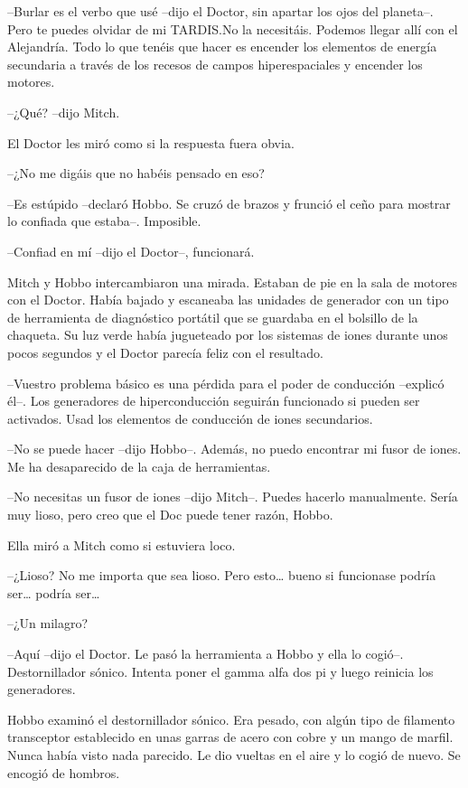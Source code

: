 {--Burlar es el verbo que usé --dijo el Doctor, sin apartar los ojos del
 planeta--. Pero te puedes olvidar de mi TARDIS.\@ No la necesitáis.
 Podemos llegar allí con el Alejandría. Todo lo que tenéis que hacer es
 encender los elementos de energía secundaria a través de los recesos de
campos hiperespaciales y encender los motores.}

{--¿Qué? --dijo Mitch.}

{El Doctor les miró como si la respuesta fuera obvia.}

{--¿No me digáis que no habéis pensado en eso?}

{--Es estúpido --declaró Hobbo. Se cruzó de brazos y frunció el ceño para
mostrar lo confiada que estaba--. Imposible.}

{--Confiad en mí --dijo el Doctor--, funcionará.}

{Mitch y Hobbo intercambiaron una mirada. Estaban de pie en la sala de
 motores con el Doctor. Había bajado y escaneaba las unidades de
 generador con un tipo de herramienta de diagnóstico portátil que se
 guardaba en el bolsillo de la chaqueta. Su luz verde había jugueteado
 por los sistemas de iones durante unos pocos segundos y el Doctor
parecía feliz con el resultado.}

{--Vuestro problema básico es una pérdida para el poder de conducción
 --explicó él--. Los generadores de hiperconducción seguirán funcionado
 si pueden ser activados. Usad los elementos de conducción de iones
secundarios.}

{--No se puede hacer --dijo Hobbo--. Además, no puedo encontrar mi fusor
de iones. Me ha desaparecido de la caja de herramientas.}

{--No necesitas un fusor de iones --dijo Mitch--. Puedes hacerlo
 manualmente. Sería muy lioso, pero creo que el Doc puede tener razón,
Hobbo.}

{Ella miró a Mitch como si estuviera loco.}

{--¿Lioso? No me importa que sea lioso. Pero esto\ldots{} bueno si
 funcionase podría ser\ldots{} podría ser\ldots{}}

{--¿Un milagro?}

{--Aquí --dijo el Doctor. Le pasó la herramienta a Hobbo y ella lo
 cogió--. Destornillador sónico. Intenta poner el gamma alfa dos pi y
luego reinicia los generadores.}

{Hobbo examinó el destornillador sónico. Era pesado, con algún tipo de
 filamento transceptor establecido en unas garras de acero con cobre y un
 mango de marfil. Nunca había visto nada parecido. Le dio vueltas en el
aire y lo cogió de nuevo. Se encogió de hombros.}

